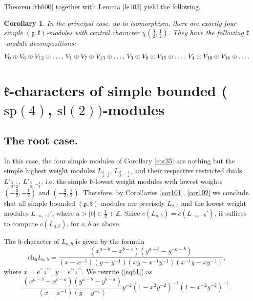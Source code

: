 \documentclass[12pt]{amsart}
\theoremstyle{plain} %
\newtheorem{corollary}[definition]{Corollary}
\newcommand{\ch}{\mathrm{ch}}
\renewcommand{\sl}{\mathrm{sl}}
\renewcommand{\sp}{\mathrm{sp}}
\newcommand {\ZZ} {\mathbb {Z}}
\newcommand{\kk}{\mathfrak{k}}
\newcommand{\hh}{\mathfrak{h}}
\renewcommand{\gg}{\mathfrak{g}}
\newcommand{\bb}{\mathfrak{b}}
\newcommand{\eps}{\epsilon}
\newcommand{\half}{\frac{1}{2}}
\newcommand{\threehalfs}{\frac{3}{2}}
\newcommand{\refle}[1]{Lemma \ref{#1}}
\newcommand{\refth}[1]{Theorem \ref{#1}}
\newcommand{\refcor}[1]{Corollary \ref{#1}}
\newcommand{\refeq}[1]{(\ref{#1})}
\begin{document}
\refth{th600} together with \refle{le103} yield the following.

\begin{corollary} \label{cor36}\relax
In the principal case, up to isomorphism, there are exactly four simple $(\gg,\kk)$-modules with central character $\chi(\threehalfs,\half)$. They have the following $\kk$-module decompositions:
\begin{equation}\label{eq72}
V_{0}\oplus V_{6}\oplus V_{12}\oplus\text{\dots , }V_{1}\oplus V_{7}\oplus V_{13}\oplus\text{\dots , }V_{3}\oplus V_{9}\oplus V_{15}\oplus\text{\dots , }V_{4}\oplus V_{10}\oplus V_{16}\oplus\dots .
\end{equation}
\end{corollary}

\section{$\kk$-characters of simple  bounded ($\sp(4)$, $\sl(2))$-modules}\label{secKchars4-2}
\subsection{The root case.}
In this case, the four simple modules of \refcor{cor35} are nothing but the simple highest weight modules $L_{\threehalfs,\half}$, $L_{\threehalfs,-\half}$, and their respective restricted duals $L'_{\threehalfs,\half}$, $L'_{\threehalfs,-\half}$, i.e. the simple $\bb$-lowest weight modules with lowest weights $(-\threehalfs,-\half)$ and $(-\threehalfs, \half)$. Therefore, by Corollaries \ref{cor101}, \ref{cor102} we conclude that all simple bounded $(\gg,\kk)$-modules are precisely $L_{a,b}$ and the lowest weight modules $L_{-a,-b}'$, where $a>|b|\in\half+\ZZ$. Since $c(L_{a,b})=c(L_{-a,-b}')$, it suffices to compute $c(L_{a,b})$, for $a,b$ as above.

The $\hh$-character of $L_{a,b}$ is given by the formula
\begin{equation}\label{eq61}
\ch_\hh L_{a,b}=\frac{(x^{a-b}-x^{b-a})(y^{a+b}-y^{-a-b})}{(x-x^{-1})(y-y^{-1})(xy-x^{-1}y^{-1})(x^{-1}y-xy^{-1})},
\end{equation}
where $x=e^{\frac{\eps_1-\eps_2}{2}}$, $y=e^{\frac{\eps_1+\eps_2}{2}}$. We rewrite \refeq{eq61} as
\begin{equation}\label{eq92}
\frac{(x^{a-b}-x^{b-a})(y^{a-b}-y^{b-a})}{(x-x^{-1})(y-y^{-1})}y^{-2}(1-x^2y^{-2})^{-1}(1-x^{-2}y^{-2})^{-1}.
\end{equation}
\end{document}

